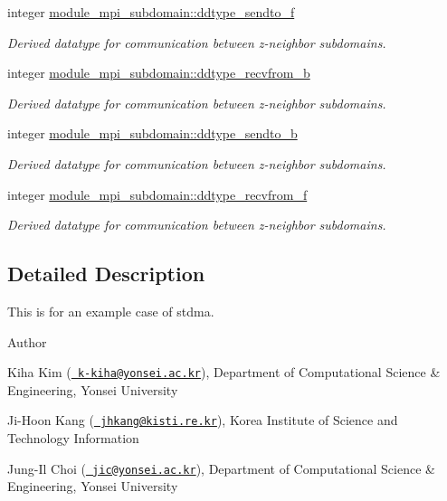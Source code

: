 \textbf{ }\par
\begin{DoxyCompactItemize}
\item 
integer \mbox{\hyperlink{namespacemodule__mpi__subdomain_aed4d71ca15cfe63b676efed68f82e313}{module\+\_\+mpi\+\_\+subdomain\+::ddtype\+\_\+sendto\+\_\+f}}
\begin{DoxyCompactList}\small\item\em Derived datatype for communication between z-\/neighbor subdomains. \end{DoxyCompactList}\item 
integer \mbox{\hyperlink{namespacemodule__mpi__subdomain_af629d0205c8f2b9528e52b300b0586d4}{module\+\_\+mpi\+\_\+subdomain\+::ddtype\+\_\+recvfrom\+\_\+b}}
\begin{DoxyCompactList}\small\item\em Derived datatype for communication between z-\/neighbor subdomains. \end{DoxyCompactList}\item 
integer \mbox{\hyperlink{namespacemodule__mpi__subdomain_a2c99ccbd4e672593f4b2068ed3bc1c5a}{module\+\_\+mpi\+\_\+subdomain\+::ddtype\+\_\+sendto\+\_\+b}}
\begin{DoxyCompactList}\small\item\em Derived datatype for communication between z-\/neighbor subdomains. \end{DoxyCompactList}\item 
integer \mbox{\hyperlink{namespacemodule__mpi__subdomain_a1af70aeca9de9289ff16adbd2d6f8bd8}{module\+\_\+mpi\+\_\+subdomain\+::ddtype\+\_\+recvfrom\+\_\+f}}
\begin{DoxyCompactList}\small\item\em Derived datatype for communication between z-\/neighbor subdomains. \end{DoxyCompactList}\end{DoxyCompactItemize}



\subsection{Detailed Description}
This is for an example case of stdma. 

\begin{DoxyAuthor}{Author}

\end{DoxyAuthor}

\begin{DoxyItemize}
\item Kiha Kim (\href{mailto:k-kiha@yonsei.ac.kr}{\texttt{ k-\/kiha@yonsei.\+ac.\+kr}}), Department of Computational Science \& Engineering, Yonsei University
\item Ji-\/\+Hoon Kang (\href{mailto:jhkang@kisti.re.kr}{\texttt{ jhkang@kisti.\+re.\+kr}}), Korea Institute of Science and Technology Information
\item Jung-\/\+Il Choi (\href{mailto:jic@yonsei.ac.kr}{\texttt{ jic@yonsei.\+ac.\+kr}}), Department of Computational Science \& Engineering, Yonsei University
\end{DoxyItemize}

